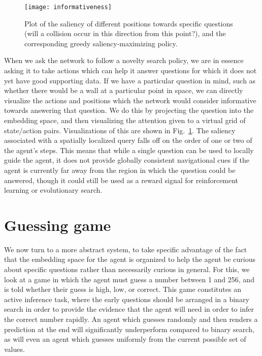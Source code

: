 \documentclass[letterpaper]{article}
\begin{document}
\begin{figure}
\texttt{[image: informativeness]}
\caption{ \label{QuestionSaliency} Plot of the saliency of different positions towards specific questions (will a collision occur in this direction from this point?), and the corresponding greedy saliency-maximizing policy. }
\end{figure}

When we ask the network to follow a novelty search policy, we are in essence asking it to take actions which can help it answer questions for which it does not yet have good supporting data. If we have a particular question in mind, such as whether there would be a wall at a particular point in space, we can directly visualize the actions and positions which the network would consider informative towards answering that question. We do this by projecting the question into the embedding space, and then visualizing the attention given to a virtual grid of state/action pairs. Visualizations of this are shown in Fig.~\ref{QuestionSaliency}. The saliency associated with a spatially localized query falls off on the order of one or two of the agent's steps. This means that while a single question can be used to locally guide the agent, it does not provide globally consistent navigational cues if the agent is currently far away from the region in which the question could be answered, though it could still be used as a reward signal for reinforcement learning or evolutionary search.

\section{Guessing game}

We now turn to a more abstract system, to take specific advantage of the fact that the embedding space for the agent is organized to help the agent be curious about specific questions rather than necessarily curious in general. For this, we look at a game in which the agent must guess a number between 1 and 256, and is told whether their guess is high, low, or correct. This game constitutes an active inference task, where the early questions should be arranged in a binary search in order to provide the evidence that the agent will need in order to infer the correct number rapidly. An agent which guesses randomly and then renders a prediction at the end will significantly underperform compared to binary search, as will even an agent which guesses uniformly from the current possible set of values.
\end{document}
